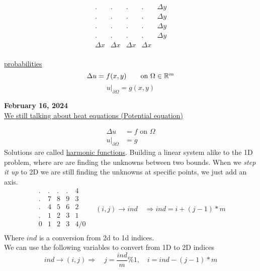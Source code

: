 \documentclass[10pt]{article}
\newcommand{\1}{\mathbb{1}}
\newcommand{\R}{\mathbb{R}}
\renewcommand{\part}{\partial}
\begin{document}
\[\begin{matrix}
   . &. &. &. & \Delta y\\
   . &. &. &. & \Delta y\\
   . &. &. &. & \Delta y\\
   . &. &. &. & \Delta y\\
    \Delta x & \Delta x & \Delta x & \Delta x\\
\end{matrix}
\]

\underline{probabilities}
\[\Delta u = f(x,y) \tag*{on $\Omega \in \R^m$}\]
\[u\big|_{\part \Omega} = g(x,y)\]


\textbf{February 16, 2024}\\

\underline{We still talking about heat equations (Potential equation)}

\begin{align*}
    \Delta u &= f \text{ on } \Omega\\
    u\big|_{\part \Omega} &= g \tag*{($\part$ is the boundary)}
\end{align*}
Solutions are called \underline{harmonic functions}. Building a linear system alike to the 1D problem, where are are finding the unknowns between two bounds. When we \textit{step it up} to 2D we are still finding the unknowns at specific points, we just add an axis.\\

\[\begin{matrix}
   . &. &. &. & 4\\
   . &7 &8 &9 & 3\\
   . &4 &5 &6 & 2\\
   . &1 &2 &3 & 1\\
   0 & 1 & 2& 3 & 4/0\\
\end{matrix}
\quad (i,j) \to ind \quad \Rightarrow ind = i + (j-1)*m
\]
Where $ind$ is a conversion from 2d to 1d indices.\\


We can use the following variables to convert from 1D to 2D indices
\[ind \to (i,j) \Rightarrow \quad j = \frac{ind}{m} \% 1, \quad i = ind - (j-1)*m\]
\end{document}
